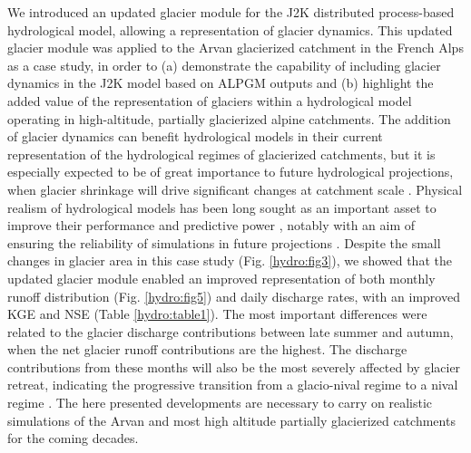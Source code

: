 We introduced an updated glacier module for the J2K distributed process-based hydrological model, allowing a representation of glacier dynamics. This updated glacier module was applied to the Arvan glacierized catchment in the French Alps as a case study, in order to (a) demonstrate the capability of including glacier dynamics in the J2K model based on ALPGM outputs and (b) highlight the added value of the representation of glaciers within a hydrological model operating in high-altitude, partially glacierized alpine catchments. The addition of glacier dynamics can benefit hydrological models in their current representation of the hydrological regimes of glacierized catchments, but it is especially expected to be of great importance to future hydrological projections, when glacier shrinkage will drive significant changes at catchment scale \citep{hock_high_2019}. Physical realism of hydrological models has been long sought as an important asset to improve their performance and predictive power \citep{hrachowitz_decade_2013}, notably with an aim of ensuring the reliability of simulations in future projections \citep[e.g.][]{gao_prediction_2020}. Despite the small changes in glacier area in this case study (Fig. \ref{hydro:fig3}), we showed that the updated glacier module enabled an improved representation of both monthly runoff distribution (Fig. \ref{hydro:fig5}) and daily discharge rates, with an improved KGE and NSE (Table \ref{hydro:table1}). The most important differences were related to the glacier discharge contributions between late summer and autumn, when the net glacier runoff contributions are the highest. The discharge contributions from these months will also be the most severely affected by glacier retreat, indicating the progressive transition from a glacio-nival regime to a nival regime \citep{hock_high_2019}. The here presented developments are necessary to carry on realistic simulations of the Arvan and most high altitude partially glacierized catchments for the coming decades. 

